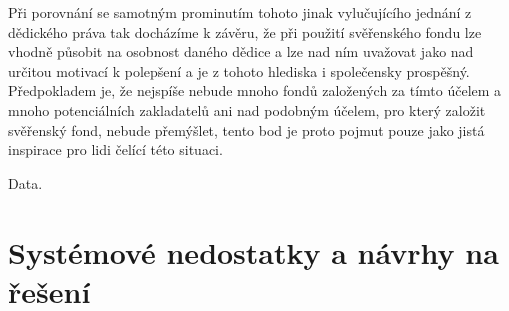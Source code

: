 \documentclass{article}
\begin{document}
Při porovnání se samotným prominutím tohoto jinak vylučujícího jednání z dědického práva tak docházíme k závěru, že při použití svěřenského fondu lze vhodně působit na osobnost daného dědice a lze nad ním uvažovat jako nad určitou motivací k polepšení a je z tohoto hlediska i společensky prospěšný. Předpokladem je, že nejspíše nebude mnoho fondů založených za tímto účelem a mnoho potenciálních zakladatelů ani nad podobným účelem, pro který založit svěřenský fond, nebude přemýšlet, tento bod je proto pojmut pouze jako jistá inspirace pro lidi čelící této situaci.\\

\newpage

\thispagestyle{smallertextinheader}
Data.
\newpage

\section{Systémové nedostatky a návrhy na řešení}








\end{document}
